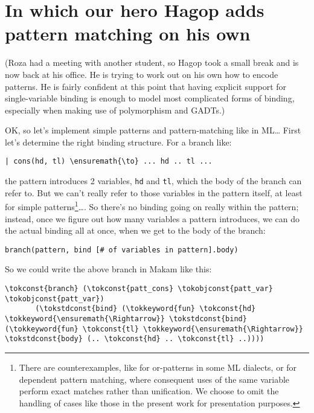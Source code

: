 \section{In which our hero Hagop adds pattern matching on his
own}\label{in-which-our-hero-hagop-adds-pattern-matching-on-his-own}

\begin{scenecomment}
(Roza had a meeting with another student, so Hagop took a small break and is now back at his
office. He is trying to work out on his own how to encode patterns. He is fairly
confident at this point that having explicit support for single-variable
binding is enough to model most complicated forms of binding, especially when making use of
polymorphism and GADTs.)
\end{scenecomment}

\identNormal
\heroSTUDENT{} OK, so let's implement simple patterns and pattern-matching
like in ML\ldots{} First let's determine the right binding structure.
For a branch like:

\begin{verbatim}
| cons(hd, tl) \ensuremath{\to} ... hd .. tl ...
\end{verbatim}

the pattern introduces 2 variables, \texttt{hd} and \texttt{tl}, which
the body of the branch can refer to. But we can't really refer to those
variables in the pattern itself, at least for simple
patterns\footnote{There are counterexamples, like for or-patterns in some ML dialects, or for dependent pattern matching, where consequent uses of the same variable perform exact matches rather than unification. We choose to omit the handling of cases like those in the present work for presentation purposes.}\ldots{}.
So there's no binding going on really within the pattern; instead, once
we figure out how many variables a pattern introduces, we can do the
actual binding all at once, when we get to the body of the branch:

\begin{verbatim}
branch(pattern, bind [# of variables in pattern].body)
\end{verbatim}

So we could write the above branch in Makam like this:

\begin{verbatim}
\tokconst{branch} (\tokconst{patt_cons} \tokobjconst{patt_var} \tokobjconst{patt_var})
       (\tokstdconst{bind} (\tokkeyword{fun} \tokconst{hd} \tokkeyword{\ensuremath{\Rightarrow}} \tokstdconst{bind} (\tokkeyword{fun} \tokconst{tl} \tokkeyword{\ensuremath{\Rightarrow}} \tokstdconst{body} (.. \tokconst{hd} .. \tokconst{tl} ..))))
\end{verbatim}

